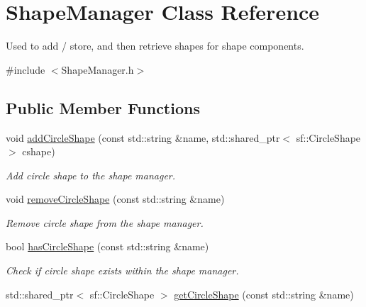\hypertarget{class_shape_manager}{\section{Shape\-Manager Class Reference}
\label{d0/d65/class_shape_manager}
}


Used to add / store, and then retrieve shapes for shape components.  




{\ttfamily \#include $<$Shape\-Manager.\-h$>$}

\subsection*{Public Member Functions}
\begin{DoxyCompactItemize}
\item 
\hypertarget{class_shape_manager_ae7bf46d25417ab569cefedf7d681461a}{void \hyperlink{class_shape_manager_ae7bf46d25417ab569cefedf7d681461a}{add\-Circle\-Shape} (const std\-::string \&name, std\-::shared\-\_\-ptr$<$ sf\-::\-Circle\-Shape $>$ cshape)}\label{d0/d65/class_shape_manager_ae7bf46d25417ab569cefedf7d681461a}

\begin{DoxyCompactList}\small\item\em Add circle shape to the shape manager. \end{DoxyCompactList}\item 
\hypertarget{class_shape_manager_abff0839a556fab28546d4e252d60460a}{void \hyperlink{class_shape_manager_abff0839a556fab28546d4e252d60460a}{remove\-Circle\-Shape} (const std\-::string \&name)}\label{d0/d65/class_shape_manager_abff0839a556fab28546d4e252d60460a}

\begin{DoxyCompactList}\small\item\em Remove circle shape from the shape manager. \end{DoxyCompactList}\item 
\hypertarget{class_shape_manager_aded6a7f38886a6bcc467f8f86c56f281}{bool \hyperlink{class_shape_manager_aded6a7f38886a6bcc467f8f86c56f281}{has\-Circle\-Shape} (const std\-::string \&name)}\label{d0/d65/class_shape_manager_aded6a7f38886a6bcc467f8f86c56f281}

\begin{DoxyCompactList}\small\item\em Check if circle shape exists within the shape manager. \end{DoxyCompactList}\item 
\hypertarget{class_shape_manager_a7767defde1e2e295054cbe7e0084b0f7}{std\-::shared\-\_\-ptr$<$ sf\-::\-Circle\-Shape $>$ \hyperlink{class_shape_manager_a7767defde1e2e295054cbe7e0084b0f7}{get\-Circle\-Shape} (const std\-::string \&name)}\label{d0/d65/class_shape_manager_a7767defde1e2e295054cbe7e0084b0f7}


\end{DoxyCompactItemize}
